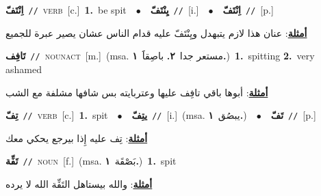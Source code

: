 \documentclass[10pt,a4paper,twoside]{article} %
\begin{document}
\begin{multicols}{2}
{{{{{{{{{{{{\setlength\topsep{0pt}\textbf{\foreignlanguage{arabic}{اِنْتَفّ}}\ {\color{gray}\texttt{//}\color{black}}\ \textsc{verb}\ [c.]\ \textbf{1.}~be spit\ \ $\bullet$\ \ \setlength\topsep{0pt}\textbf{\foreignlanguage{arabic}{يِنْتَفّ}}\ {\color{gray}\texttt{//}\color{black}}\ [i.]\ \ $\bullet$\ \ \setlength\topsep{0pt}\textbf{\foreignlanguage{arabic}{اِنْتَفّ}}\ {\color{gray}\texttt{//}\color{black}}\ [p.]\  \begin{flushright}\color{gray}\foreignlanguage{arabic}{\textbf{\underline{\foreignlanguage{arabic}{أمثلة}}}: عنان هذا لازم يتبهدل ويِنْتَفّ عليه قدام الناس عشان يصير عبرة للجميع}\end{flushright}\color{black}} \vspace{2mm}

{\setlength\topsep{0pt}\textbf{\foreignlanguage{arabic}{تَافِف}}\ {\color{gray}\texttt{//}\color{black}}\ \textsc{noun\textunderscore act}\ [m.]\ \color{gray}(msa. \foreignlanguage{arabic}{مستعر جدا}~\foreignlanguage{arabic}{\textbf{٢.}}  \foreignlanguage{arabic}{باصِقاََ}~\foreignlanguage{arabic}{\textbf{١.}})\color{black}\ \textbf{1.}~spitting  \textbf{2.}~very ashamed\  \begin{flushright}\color{gray}\foreignlanguage{arabic}{\textbf{\underline{\foreignlanguage{arabic}{أمثلة}}}: أبوها باقي تافِف عليها وعتربايته بس شافها مشلفة مع الشب}\end{flushright}\color{black}} \vspace{2mm}

{\setlength\topsep{0pt}\textbf{\foreignlanguage{arabic}{تِفّ}}\ {\color{gray}\texttt{//}\color{black}}\ \textsc{verb}\ [c.]\ \textbf{1.}~spit\ \ $\bullet$\ \ \setlength\topsep{0pt}\textbf{\foreignlanguage{arabic}{يتِفّ}}\ {\color{gray}\texttt{//}\color{black}}\ [i.]\ \color{gray}(msa. \foreignlanguage{arabic}{يبصُق}~\foreignlanguage{arabic}{\textbf{١.}})\color{black}\ \ $\bullet$\ \ \setlength\topsep{0pt}\textbf{\foreignlanguage{arabic}{تَفّ}}\ {\color{gray}\texttt{//}\color{black}}\ [p.]\  \begin{flushright}\color{gray}\foreignlanguage{arabic}{\textbf{\underline{\foreignlanguage{arabic}{أمثلة}}}: تِف عليه إِذا بيرجع يحكي معك}\end{flushright}\color{black}} \vspace{2mm}

{\setlength\topsep{0pt}\textbf{\foreignlanguage{arabic}{تَفِّة}}\ {\color{gray}\texttt{//}\color{black}}\ \textsc{noun}\ [f.]\ \color{gray}(msa. \foreignlanguage{arabic}{بَصْقَة}~\foreignlanguage{arabic}{\textbf{١.}})\color{black}\ \textbf{1.}~spit\  \begin{flushright}\color{gray}\foreignlanguage{arabic}{\textbf{\underline{\foreignlanguage{arabic}{أمثلة}}}: والله بيستاهل التَفِّة الله لا يرده}\end{flushright}\color{black}} \vspace{2mm}

}}}}}}}}}}}
\end{multicols}
\end{document}
